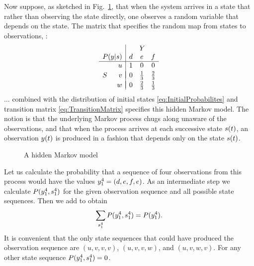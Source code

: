 %
Now suppose, as sketched in Fig.~\ref{fig:dhmm}, that when the system
arrives in a state that rather than observing the state directly, one
observes a random variable that depends on the state.  The matrix that
specifies the random map from states to observations, \ie%
:
\begin{equation*}
  \begin{array}{cr|ccc}
      &      &\multicolumn{3}{c}{Y} \\
      \multicolumn{2}{r|}{P(y|s)} & d & e           & f \\ %
      \hline%
      & u      & 1 & 0           & 0 \\
      &        & \vspace{-1 em} \\
    S & v      & 0 & \frac{1}{3} & \frac{2}{3} \\
      &        & \vspace{-1 em} \\
      & w      & 0 & \frac{2}{3} & \frac{1}{3}
  \end{array}%
\end{equation*}
$\ldots$ %
combined with the distribution of initial states
\eqref{eq:InitialProbabilites} and transition matrix
\eqref{eq:TransitionMatrix} specifies this hidden Markov model.  The
notion is that the underlying Markov process chugs along unaware of
the observations, and that when the process arrives at each successive
state ${s}{(t)}$, an observation ${y}{(t)}$ is produced in a fashion
that depends only on the state ${s}{(t)}$.

\begin{figure}[htbp]
  \centering{\plotsize%
    }
  \caption[A hidden Markov model.]{A hidden Markov model}
  \label{fig:dhmm}
\end{figure}

Let us calculate the probability that a sequence of four observations
from this process would have the values $y_{1}^{4} = (d,e,f,e)$.
As an intermediate step we calculate $P(y_{1}^{4},s_{1}^{4})$
for the given observation sequence and all possible state sequences.
Then we add to obtain
\begin{equation}
  \label{eq:dhmm_sum}
  \sum_{s_{1}^{4}} P(y_{1}^{4},s_{1}^{4}) = P(y_{1}^{4}).
\end{equation}
It is convenient that the only state sequences that could have
produced the observation sequence are $(u,v,v,v)$, $(u,v,v,w)$, and
$(u,v,w,v)$.  For any other state sequence
$P(y_{1}^{4},s_{1}^{4}) = 0$.

